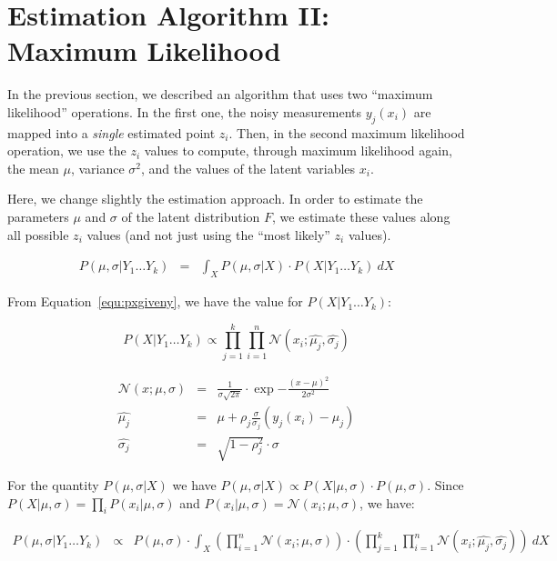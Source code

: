 

\section{Estimation Algorithm II: Maximum Likelihood}

In the previous section, we described an algorithm that uses two ``maximum likelihood'' operations. In the first one, the noisy measurements $y_j(x_i)$ are mapped into a \emph{single} estimated point $z_i$. Then, in the second maximum likelihood operation, we use the $z_i$ values to compute, through maximum likelihood again, the mean $\mu$, variance $\sigma^2$, and the values of the latent variables $x_i$. 

Here, we change slightly the estimation approach. In order to estimate the parameters $\mu$ and $\sigma$ of the latent distribution $F$, we estimate these values along all possible $z_i$ values (and not just using the ``most likely'' $z_i$ values).

\begin{eqnarray}
P(\mu, \sigma | Y_1 \ldots Y_k) 
& = & \int_X P(\mu, \sigma | X) \cdot P ( X | Y_1 \ldots Y_k) \ dX \nonumber
\end{eqnarray}

From Equation~\ref{equ:pxgiveny}, we have the value for $P ( X | Y_1 \ldots Y_k)$:

\begin{equation}
\label{equ:pxgiveny-exp}
P ( X | Y_1 \ldots Y_k) \propto  \prod_{j=1}^k \prod_{i=1}^n \mathcal{N}\left(x_i; \widehat{\mu_j},  \widehat{\sigma_j}\right)
\end{equation}

\begin{eqnarray}
\mathcal{N}(x; \mu, \sigma) & = & \frac{1}{\sigma\sqrt{2\pi}} \cdot \exp{ -\frac{(x-\mu)^2}{2\sigma^2} } \nonumber \\
\widehat{\mu_j} &= &\mu + \rho_j \frac{\sigma}{\sigma_j} (y_j(x_i) - \mu_j) \nonumber \\
\widehat{\sigma_j} &=& \sqrt{1-\rho_j^2} \cdot \sigma \nonumber 
\end{eqnarray}

For the quantity $P(\mu, \sigma | X)$ we have $P(\mu, \sigma| X) \propto P(X | \mu, \sigma) \cdot P(\mu, \sigma)$. Since $P(X | \mu, \sigma) = \prod_i P(x_i | \mu,  \sigma)$ and $P(x_i | \mu,  \sigma) = \mathcal{N}(x_i; \mu, \sigma)$, we have:


\begin{eqnarray}
P(\mu, \sigma | Y_1 \ldots Y_k) 
& \propto & P(\mu, \sigma) \cdot \int_X \left( \prod_{i=1}^n \mathcal{N}(x_i; \mu, \sigma) \right) \cdot  \left(  \prod_{j=1}^k \prod_{i=1}^n \mathcal{N}\left(x_i; \widehat{\mu_j},  \widehat{\sigma_j}\right) \right) \ dX \nonumber
\end{eqnarray}

